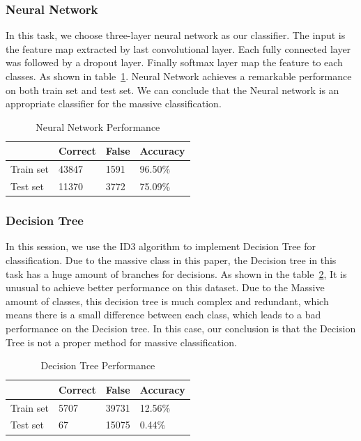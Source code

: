\documentclass[runningheads]{llncs}
\begin{document}
\subsubsection{Neural Network}
In this task, we choose three-layer neural network as our classifier. The input is the feature map extracted by last convolutional layer. Each fully connected layer was followed by a dropout layer. Finally softmax layer map the feature to each classes. As shown in table~\ref{tab3}. Neural Network achieves a remarkable performance on both train set and test set. We can conclude that the Neural network is an appropriate classifier for the massive classification.
\begin{table}
	\caption{Neural Network Performance }\label{tab3}
	\begin{center}
		\begin{tabular}{|l|l|l|l|}
			\hline
			& Correct & False & Accuracy\\
			\hline
			Train set &  43847  &  1591   & 96.50\% \\
			Test set  & 11370   &  3772   & 75.09\%\\
			\hline
		\end{tabular}
	\end{center}
\end{table}


\subsubsection{Decision Tree}
In this session, we use the ID3 algorithm to implement Decision Tree for classification. Due to the massive class in this paper, the Decision tree in this task has a huge amount of branches for decisions. As shown in the table~\ref{tab4}, It is unusual to achieve better performance on this dataset. Due to the Massive amount of classes, this decision tree is much complex and redundant, which means there is a small difference between each class, which leads to a bad performance on the Decision tree. In this case, our conclusion is that the Decision Tree is not a proper method for massive classification.

\begin{table}
	\caption{Decision Tree Performance }\label{tab4}
	\begin{center}
		\begin{tabular}{|l|l|l|l|}
			\hline
			          & Correct & False & Accuracy\\
			\hline
			Train set &  5707  &   39731   & 12.56\% \\
			Test set  &  67    &   15075   & 0.44\%\\
			\hline
		\end{tabular}
	\end{center}
\end{table}
\end{document}
